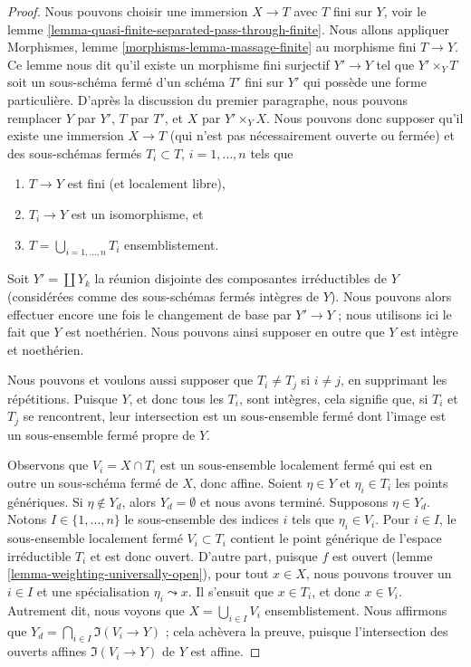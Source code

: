 \begin{proof}
\medskip\noindent
Nous pouvons choisir une immersion $X \to T$ avec $T$ fini sur $Y$, voir le lemme
\ref{lemma-quasi-finite-separated-pass-through-finite}.
Nous allons appliquer Morphismes, lemme \ref{morphisms-lemma-massage-finite}
au morphisme fini $T \to Y$. Ce lemme nous dit qu'il
existe un morphisme fini surjectif $Y' \to Y$ tel que
$Y' \times_Y T$ soit un sous-schéma fermé d'un schéma $T'$ fini sur $Y'$
qui possède une forme particulière.
D'après la discussion du premier paragraphe, nous pouvons remplacer $Y$ par $Y'$,
$T$ par $T'$, et $X$ par $Y' \times_Y X$.
Nous pouvons donc supposer qu'il existe une immersion $X \to T$ (qui n'est pas nécessairement
ouverte ou fermée) et des sous-schémas fermés
$T_i \subset T$, $i = 1, \ldots, n$ tels que
\begin{enumerate}
\item $T \to Y$ est fini (et localement libre),
\item $T_i \to Y$ est un isomorphisme, et
\item $T = \bigcup_{i = 1, \ldots, n} T_i$ ensemblistement.
\end{enumerate}
Soit $Y' = \coprod Y_k$ la réunion disjointe des composantes irréductibles
de $Y$ (considérées comme des sous-schémas fermés intègres de $Y$).
Nous pouvons alors effectuer encore une fois le changement de base par $Y' \to Y$ ; nous
utilisons ici le fait que $Y$ est noethérien. Nous pouvons ainsi supposer en
outre que $Y$ est intègre et noethérien.

\medskip\noindent
Nous pouvons et voulons aussi supposer que $T_i \not = T_j$ si $i \not = j$, en
supprimant les répétitions. Puisque $Y$, et donc tous les $T_i$, sont intègres, cela
signifie que, si $T_i$ et $T_j$ se rencontrent, leur intersection est un
sous-ensemble fermé dont l'image est un sous-ensemble fermé propre de $Y$.

\medskip\noindent
Observons que $V_i = X \cap T_i$ est un sous-ensemble localement fermé
qui est en outre un sous-schéma fermé de $X$, donc affine.
Soient $\eta \in Y$ et $\eta_i \in T_i$ les points génériques.
Si $\eta \not \in Y_d$, alors $Y_d = \emptyset$ et nous avons terminé.
Supposons $\eta \in Y_d$. Notons $I \in \{1, \ldots, n\}$
le sous-ensemble des indices $i$ tels que $\eta_i \in V_i$.
Pour $i \in I$, le sous-ensemble localement fermé $V_i \subset T_i$
contient le point générique de l'espace irréductible $T_i$
et est donc ouvert. D'autre part, puisque $f$ est ouvert
(lemme \ref{lemma-weighting-universally-open}),
pour tout $x \in X$, nous pouvons trouver un $i \in I$ et une spécialisation
$\eta_i \leadsto x$. Il s'ensuit que $x \in T_i$, et donc
$x \in V_i$. Autrement dit, nous voyons que $X = \bigcup_{i \in I} V_i$
ensemblistement.
Nous affirmons que $Y_d = \bigcap_{i \in I} \Im(V_i \to Y)$ ; cela
achèvera la preuve, puisque l'intersection des ouverts affines
$\Im(V_i \to Y)$ de $Y$ est affine.


\end{proof}
